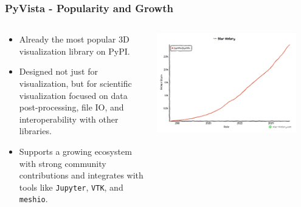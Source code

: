 \documentclass[t]{beamer}
\renewcommand{\small}{\footnotesize}
\renewcommand{\footnotesize}{\scriptsize}
\begin{document}
\begin{frame}
    \frametitle{PyVista - Popularity and Growth}

    \begin{center}
        \begin{columns}[T]
            \begin{column}{.6\textwidth}
                \small
                \begin{itemize}[leftmargin=10pt, label=•]
                    \item Already the most popular 3D visualization library on PyPI.
                    \item Designed not just for visualization, but for scientific
                          visualization focused on data post-processing, file IO, and
                          interoperability with other libraries.
                    \item Supports a growing ecosystem with strong community
                          contributions and integrates with tools like \texttt{Jupyter},
                          \texttt{VTK}, and \texttt{meshio}.
                \end{itemize}
            \end{column}

            \begin{column}{.5\textwidth}
                \vspace{-5pt}
                \centering
                \includegraphics[width=0.9\textwidth]{figures/overview-stars-graph-trans.png}
            \end{column}

        \end{columns}


\end{center}
\end{frame}
\end{document}

